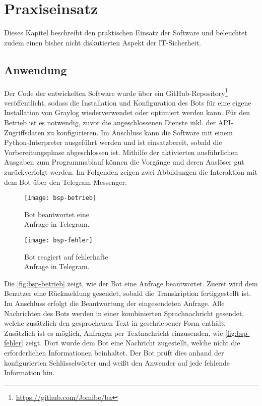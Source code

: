 \chapter{Praxiseinsatz}
\label{cha:praxiseinsatz}

Dieses Kapitel beschreibt den praktischen Einsatz der Software und beleuchtet zudem einen bisher nicht diskutierten Aspekt der IT-Sicherheit.

\section{Anwendung}

Der Code der entwickelten Software wurde über ein GitHub-Repository\footnote{\url{https://github.com/Jomibe/ba}} veröffentlicht, sodass die Installation und Konfiguration des Bots für eine eigene Installation von Graylog wiederverwendet oder optimiert werden kann. Für den Betrieb ist es notwendig, zuvor die angeschlossenen Dienste inkl. der API-Zugriffsdaten zu konfigurieren. Im Anschluss kann die Software mit einem Python-Interpreter ausgeführt werden und ist einsatzbereit, sobald die Vorbereitungsphase abgeschlossen ist. Mithilfe der aktivierten ausführlichen Ausgaben zum Programmablauf können die Vorgänge und deren Auslöser gut zurückverfolgt werden. Im Folgenden zeigen zwei Abbildungen die Interaktion mit dem Bot über den Telegram Messenger:

\begin{figure}[h!]
    \centering
    \begin{minipage}{0.5\textwidth}
        \raggedright
        \texttt{[image: bsp-betrieb]}
        \caption{Bot beantwortet eine \\\hspace{\textwidth}Anfrage in Telegram.}
        \label{fig:bsp-betrieb}
    \end{minipage}\hfill
    \begin{minipage}{0.5\textwidth}
        \raggedleft
        \texttt{[image: bsp-fehler]}
        \caption{Bot reagiert auf fehlerhafte \\\hspace{\textwidth}Anfrage in Telegram.}
        \label{fig:bsp-fehler}
    \end{minipage}
\end{figure}

Die \autoref{fig:bsp-betrieb} zeigt, wie der Bot eine Anfrage beantwortet. Zuerst wird dem Benutzer eine Rückmeldung gesendet, sobald die Transkription fertiggestellt ist. Im Anschluss erfolgt die Beantwortung der eingesendeten Anfrage. Alle Nachrichten des Bots werden in einer kombinierten Sprachnachricht gesendet, welche zusätzlich den gesprochenen Text in geschriebener Form enthält. Zusätzlich ist es möglich, Anfragen per Textnachricht einzusenden, wie \autoref{fig:bsp-fehler} zeigt. Dort wurde dem Bot eine Nachricht zugestellt, welche nicht die erforderlichen Informationen beinhaltet. Der Bot prüft dies anhand der konfigurierten Schlüsselwörter und weißt den Anwender auf jede fehlende Information hin. 

